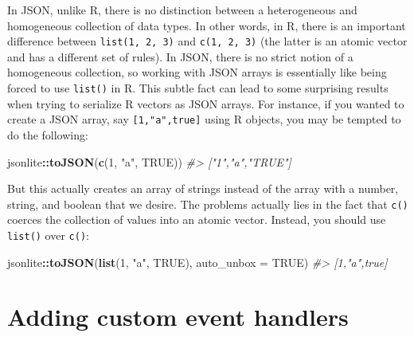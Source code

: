 \documentclass[
  12pt,
]{krantz}
\newenvironment{Shaded}{\begin{snugshade}}{\end{snugshade}}
\newcommand{\CommentTok}[1]{\textcolor[rgb]{0.56,0.35,0.01}{\textit{#1}}}
\newcommand{\DataTypeTok}[1]{\textcolor[rgb]{0.13,0.29,0.53}{#1}}
\newcommand{\DecValTok}[1]{\textcolor[rgb]{0.00,0.00,0.81}{#1}}
\newcommand{\KeywordTok}[1]{\textcolor[rgb]{0.13,0.29,0.53}{\textbf{#1}}}
\newcommand{\NormalTok}[1]{#1}
\newcommand{\OperatorTok}[1]{\textcolor[rgb]{0.81,0.36,0.00}{\textbf{#1}}}
\newcommand{\OtherTok}[1]{\textcolor[rgb]{0.56,0.35,0.01}{#1}}
\newcommand{\StringTok}[1]{\textcolor[rgb]{0.31,0.60,0.02}{#1}}
\begin{document}
In JSON, unlike R, there is no distinction between a heterogeneous and homogeneous collection of data types. In other words, in R, there is an important difference between \texttt{list(1,\ 2,\ 3)} and \texttt{c(1,\ 2,\ 3)} (the latter is an atomic vector and has a different set of rules). In JSON, there is no strict notion of a homogeneous collection, so working with JSON arrays is essentially like being forced to use \texttt{list()} in R. This subtle fact can lead to some surprising results when trying to serialize R vectors as JSON arrays. For instance, if you wanted to create a JSON array, say \texttt{{[}1,"a",true{]}} using R objects, you may be tempted to do the following:

\begin{Shaded}
\begin{Highlighting}[]
\NormalTok{jsonlite}\OperatorTok{::}\KeywordTok{toJSON}\NormalTok{(}\KeywordTok{c}\NormalTok{(}\DecValTok{1}\NormalTok{, }\StringTok{"a"}\NormalTok{, }\OtherTok{TRUE}\NormalTok{))}
\CommentTok{#> ["1","a","TRUE"] }
\end{Highlighting}
\end{Shaded}

But this actually creates an array of strings instead of the array with a number, string, and boolean that we desire. The problems actually lies in the fact that \texttt{c()} coerces the collection of values into an atomic vector. Instead, you should use \texttt{list()} over \texttt{c()}:

\begin{Shaded}
\begin{Highlighting}[]
\NormalTok{jsonlite}\OperatorTok{::}\KeywordTok{toJSON}\NormalTok{(}\KeywordTok{list}\NormalTok{(}\DecValTok{1}\NormalTok{, }\StringTok{"a"}\NormalTok{, }\OtherTok{TRUE}\NormalTok{), }\DataTypeTok{auto_unbox =} \OtherTok{TRUE}\NormalTok{)}
\CommentTok{#> [1,"a",true]}
\end{Highlighting}
\end{Shaded}

\hypertarget{js-event-handlers}{%
\chapter{Adding custom event handlers}\label{js-event-handlers}}
\end{document}
